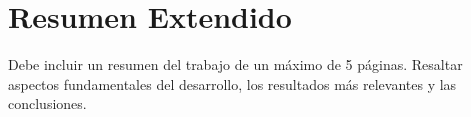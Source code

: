 \chapter{Resumen Extendido}
Debe incluir un resumen del trabajo de un máximo de 5 páginas. Resaltar aspectos fundamentales del desarrollo, los resultados más relevantes y las conclusiones.

